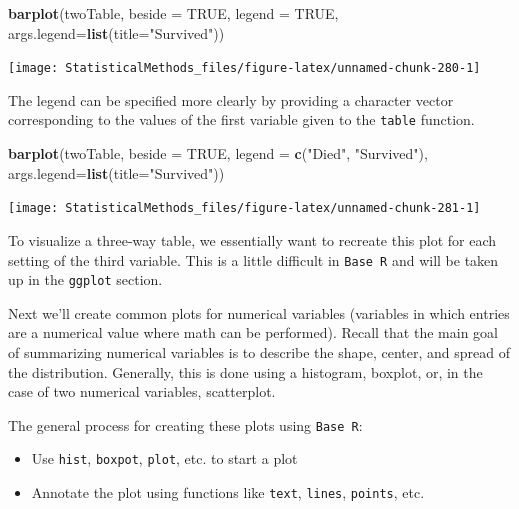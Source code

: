 \documentclass[
]{book}
\newenvironment{Shaded}{\begin{snugshade}}{\end{snugshade}}
\newcommand{\DataTypeTok}[1]{\textcolor[rgb]{0.13,0.29,0.53}{#1}}
\newcommand{\KeywordTok}[1]{\textcolor[rgb]{0.13,0.29,0.53}{\textbf{#1}}}
\newcommand{\NormalTok}[1]{#1}
\newcommand{\OtherTok}[1]{\textcolor[rgb]{0.56,0.35,0.01}{#1}}
\newcommand{\StringTok}[1]{\textcolor[rgb]{0.31,0.60,0.02}{#1}}
\theoremstyle{definition}
\theoremstyle{definition}
\theoremstyle{definition}
\theoremstyle{remark}
\begin{document}
\begin{Shaded}
\begin{Highlighting}[]
\KeywordTok{barplot}\NormalTok{(twoTable, }\DataTypeTok{beside =} \OtherTok{TRUE}\NormalTok{, }\DataTypeTok{legend =} \OtherTok{TRUE}\NormalTok{, }\DataTypeTok{args.legend=}\KeywordTok{list}\NormalTok{(}\DataTypeTok{title=}\StringTok{"Survived"}\NormalTok{))}
\end{Highlighting}
\end{Shaded}

\begin{center}\texttt{[image: StatisticalMethods\_files/figure-latex/unnamed-chunk-280-1]} \end{center}

The legend can be specified more clearly by providing a character vector corresponding to the values of the first variable given to the \texttt{table} function.

\begin{Shaded}
\begin{Highlighting}[]
\KeywordTok{barplot}\NormalTok{(twoTable, }\DataTypeTok{beside =} \OtherTok{TRUE}\NormalTok{, }\DataTypeTok{legend =} \KeywordTok{c}\NormalTok{(}\StringTok{"Died"}\NormalTok{, }\StringTok{"Survived"}\NormalTok{),}
        \DataTypeTok{args.legend=}\KeywordTok{list}\NormalTok{(}\DataTypeTok{title=}\StringTok{"Survived"}\NormalTok{))}
\end{Highlighting}
\end{Shaded}

\begin{center}\texttt{[image: StatisticalMethods\_files/figure-latex/unnamed-chunk-281-1]} \end{center}

To visualize a three-way table, we essentially want to recreate this plot for each setting of the third variable. This is a little difficult in \texttt{Base\ R} and will be taken up in the \texttt{ggplot} section.

Next we'll create common plots for numerical variables (variables in which entries are a numerical value where math can be performed). Recall that the main goal of summarizing numerical variables is to describe the shape, center, and spread of the distribution. Generally, this is done using a histogram, boxplot, or, in the case of two numerical variables, scatterplot.

The general process for creating these plots using \texttt{Base\ R}:

\begin{itemize}
\item
  Use \texttt{hist}, \texttt{boxpot}, \texttt{plot}, etc. to start a plot
\item
  Annotate the plot using functions like \texttt{text}, \texttt{lines}, \texttt{points}, etc.
\end{itemize}
\end{document}
